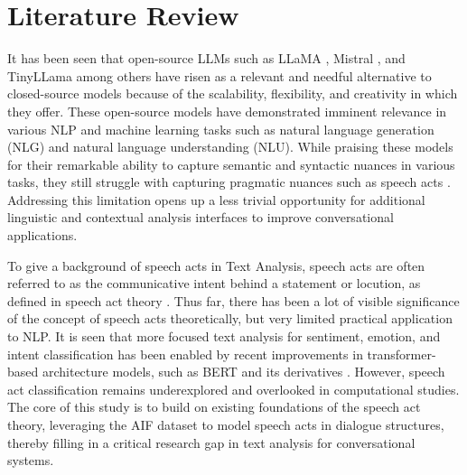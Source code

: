 \section{Literature Review}
It has been seen that open-source LLMs such as LLaMA \cite{touvron2023llama}, Mistral \cite{yu2024breakingceilingllmcommunity}, and TinyLLama among others have risen as a relevant and needful alternative to closed-source models because of the scalability, flexibility, and creativity in which they offer. These open-source models have demonstrated imminent relevance in various NLP and machine learning tasks such as natural language generation (NLG) and natural language understanding (NLU). While praising these models for their remarkable ability to capture semantic and syntactic nuances in various tasks, they still struggle with capturing pragmatic nuances such as speech acts \cite{Dresner2003-DREROB-3}. Addressing this limitation opens up a less trivial opportunity for additional linguistic and contextual analysis interfaces to improve conversational applications. 

To give a background of speech acts in Text Analysis, speech acts are often referred to as the communicative intent behind a statement or locution, as defined in speech act theory \cite{austin1962speech} \cite{searle1969speech}. Thus far, there has been a lot of visible significance of the concept of speech acts theoretically, but very limited practical application to NLP. It is seen that more focused text analysis for sentiment, emotion, and intent classification has been enabled by recent improvements in transformer-based architecture models, such as BERT and its derivatives \cite{devlin2018bert}. However, speech act classification remains underexplored and overlooked in computational studies. The core of this study is to build on existing foundations of the speech act theory, leveraging the AIF dataset to model speech acts in dialogue structures, thereby filling in a critical research gap in text analysis for conversational systems.